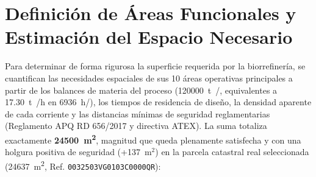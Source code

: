 \documentclass{report}
\begin{document}
\section{Definición de Áreas Funcionales y Estimación del Espacio Necesario}
Para determinar de forma rigurosa la superficie requerida por la biorrefinería, se cuantifican las necesidades espaciales de sus \num{10} áreas operativas principales a partir de los balances de materia del proceso (\SI{120000}{\tonne{}/}, equivalentes a \SI{17.30}{\tonne{}/h} en \SI{6936}{h/}), los tiempos de residencia de diseño, la densidad aparente de cada corriente y las distancias mínimas de seguridad reglamentarias (Reglamento APQ RD 656/2017 y directiva ATEX). La suma totaliza exactamente \textbf{\SI{24500}{\square\metre}}, magnitud que queda plenamente satisfecha y con una holgura positiva de seguridad (+137~$\text{m}^2$) en la parcela catastral real seleccionada (\SI{24637}{\square\metre}, Ref. \texttt{0032503VG0103C0000QR}):
\end{document}

